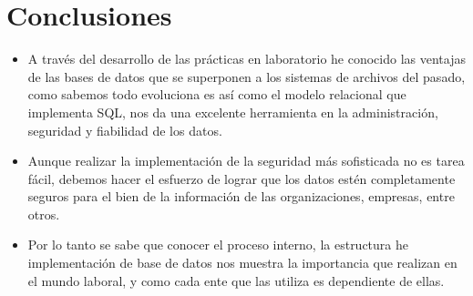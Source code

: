 \documentclass[%
 reprint,
 amsmath,amssymb,
 aps,
]{revtex4-1}
\begin{document}
\section{Conclusiones}

\begin{itemize}
	\item A través del desarrollo de las prácticas en laboratorio he conocido las ventajas de las bases de datos que se superponen a los sistemas de archivos del pasado, como sabemos todo evoluciona es así como el modelo relacional que implementa SQL, nos da una excelente herramienta en la administración, seguridad y fiabilidad de los datos.
	\item Aunque realizar la implementación de la seguridad más sofisticada no es tarea fácil, debemos hacer el esfuerzo de lograr que los datos estén completamente seguros para el bien de la información de las organizaciones, empresas, entre otros.
           \item Por lo tanto se sabe que conocer el proceso interno, la estructura he implementación de base de datos nos muestra la importancia que realizan en el mundo laboral, y como cada ente que las utiliza es dependiente de ellas.

\end{itemize}





\end{document}
